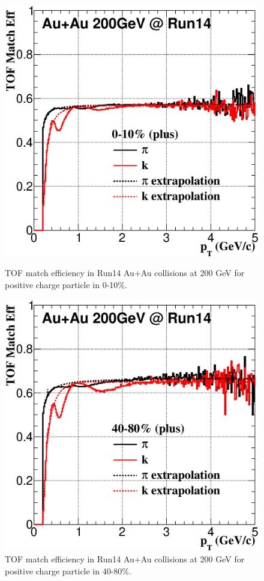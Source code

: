 \begin{figure}[htbp]
\begin{minipage}[htbp]{0.52\linewidth}
\centering
\includegraphics[width=1.0\textwidth]{figure/Run14_D0HFT/tofMatchEff_Run14_Fit_cent1.eps}
\caption{TOF match efficiency in Run14 Au+Au collisions at 200 GeV for positive charge particle in 0-10\%. \label{fig:mtof010}}
\end{minipage}
\hfill
\begin{minipage}[htbp]{0.52\linewidth}
\centering
\includegraphics[width=1.0\textwidth]{figure/Run14_D0HFT/tofMatchEff_Run14_Fit_cent3.eps} 
\caption{TOF match efficiency in Run14 Au+Au collisions at 200 GeV for positive charge particle in 40-80\%. \label{fig:mtof4080}}
\end{minipage}
\end{figure}



